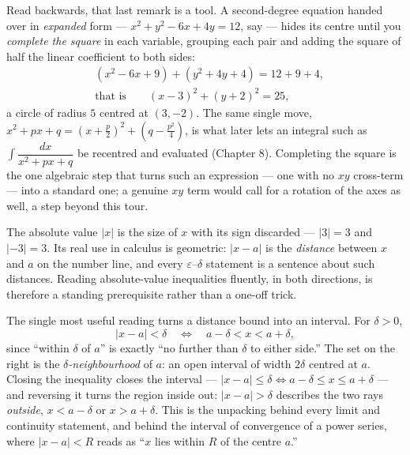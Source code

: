 \documentclass[a4paper,12pt,oneside]{memoir}
\begin{document}
Read backwards, that last remark is a tool. A second-degree equation handed over in \emph{expanded} form — \(x^2 + y^2 - 6x + 4y = 12\), say — hides its centre until you \emph{complete the square} in each variable, grouping each pair and adding the square of half the linear coefficient to both sides: \[ \begin{aligned}
    &(x^2 - 6x + 9) + (y^2 + 4y + 4) = 12 + 9 + 4, \\
    &\text{that is}\qquad (x - 3)^2 + (y + 2)^2 = 25,
  \end{aligned} \] a circle of radius \(5\) centred at \((3, -2)\). The same single move, \(x^2 + px + q = \left(x + \tfrac{p}{2}\right)^2 + \left(q - \tfrac{p^2}{4}\right)\), is what later lets an integral such as \(\int \dfrac{dx}{x^2 + px + q}\) be recentred and evaluated (Chapter 8). Completing the square is the one algebraic step that turns such an expression — one with no \(xy\) cross-term — into a standard one; a genuine \(xy\) term would call for a rotation of the axes as well, a step beyond this tour.


The absolute value \(|x|\) is the size of \(x\) with its sign discarded — \(|3| = 3\) and \(|-3| = 3\). Its real use in calculus is geometric: \(|x - a|\) is the \emph{distance} between \(x\) and \(a\) on the number line, and every \(\varepsilon\)–\(\delta\) statement is a sentence about such distances. Reading absolute-value inequalities fluently, in both directions, is therefore a standing prerequisite rather than a one-off trick.

The single most useful reading turns a distance bound into an interval. For \(\delta > 0\), \[ |x - a| < \delta \quad\Longleftrightarrow\quad a - \delta < x < a + \delta, \] since “within \(\delta\) of \(a\)” is exactly “no further than \(\delta\) to either side.” The set on the right is the \emph{\(\delta\)-neighbourhood} of \(a\): an open interval of width \(2\delta\) centred at \(a\). Closing the inequality closes the interval — \(|x - a| \le \delta \Leftrightarrow a - \delta \le x \le a + \delta\) — and reversing it turns the region inside out: \(|x - a| > \delta\) describes the two rays \emph{outside}, \(x < a - \delta\) or \(x > a + \delta\). This is the unpacking behind every limit and continuity statement, and behind the interval of convergence of a power series, where \(|x - a| < R\) reads as “\(x\) lies within \(R\) of the centre \(a\).”
\end{document}
